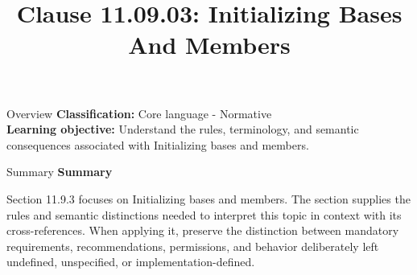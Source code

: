 \documentclass[10pt,letterpaper]{article}
\title{Clause 11.09.03: Initializing Bases And Members}
\author{}
\date{}
\begin{document}
\maketitle
\begin{CornellOverviewBox}{Overview}
\textbf{Classification:} Core language - Normative\\[2pt]
\textbf{Learning objective:} Understand the rules, terminology, and semantic consequences associated with Initializing bases and members.
\end{CornellOverviewBox}\begin{CornellSummaryBox}{Summary}
{\sffamily\bfseries\color{Accent} Summary}\par\vspace{3pt}Section 11.9.3 focuses on Initializing bases and members. The section supplies the rules and semantic distinctions needed to interpret this topic in context with its cross-references. When applying it, preserve the distinction between mandatory requirements, recommendations, permissions, and behavior deliberately left undefined, unspecified, or implementation-defined.
\end{CornellSummaryBox}
\end{document}
